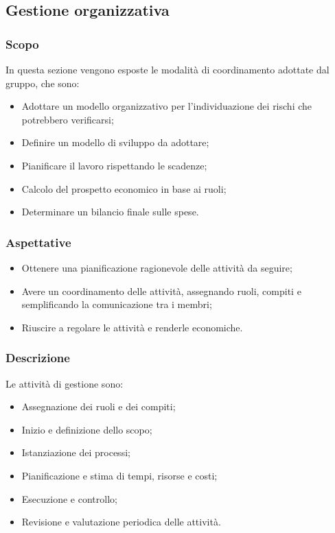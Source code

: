 \subsection{Gestione organizzativa}
\subsubsection{Scopo}
In questa sezione vengono esposte le modalità di coordinamento adottate dal gruppo, che sono:
\begin{itemize}
\item Adottare un modello organizzativo per l'individuazione dei rischi che potrebbero verificarsi;
\item Definire un modello di sviluppo da adottare;
\item Pianificare il lavoro rispettando le scadenze;
\item Calcolo del prospetto economico in base ai ruoli;
\item Determinare un bilancio finale sulle spese.
\end{itemize}

\subsubsection{Aspettative}
\begin{itemize}
\item Ottenere una pianificazione ragionevole delle attività da seguire;
\item Avere un coordinamento delle attività, assegnando ruoli, compiti e semplificando la comunicazione tra i membri;
\item Riuscire a regolare le attività e renderle economiche.
\end{itemize}

\subsubsection{Descrizione}
Le attività  di gestione sono: 
\begin{itemize}
\item Assegnazione dei ruoli e dei compiti;
\item Inizio e definizione dello scopo;
\item Istanziazione dei processi;
\item Pianificazione e stima di tempi, risorse e costi;
\item Esecuzione e controllo;
\item Revisione e valutazione periodica delle attività.
\end{itemize}

